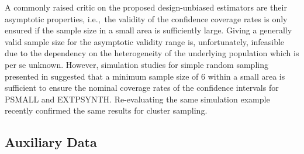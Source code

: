 \documentclass[remotesensing,article,accept,moreauthors,pdftex,10pt,a4paper]{Definitions/mdpi}
\newcommand{\psmall}{PSMALL}
\newcommand{\extpsynth}{EXTPSYNTH}
\begin{document}
A commonly raised critic on the proposed design-unbiased estimators are their asymptotic properties, i.e.,~the validity of the confidence coverage rates is only ensured if the sample size in a small area is sufficiently large. Giving a generally valid sample size for the asymptotic validity range is, unfortunately, infeasible due to the dependency on the heterogeneity of the underlying population which is per se unknown. However, simulation studies for simple random sampling presented in \citet{mandallaz2013b} suggested that a minimum sample size of 6 within a small area is sufficient to ensure the nominal coverage rates of the confidence intervals for \psmall{} and \extpsynth{}. Re-evaluating the same simulation example recently confirmed the same results for cluster sampling.

\subsection{Auxiliary Data}
\end{document}

